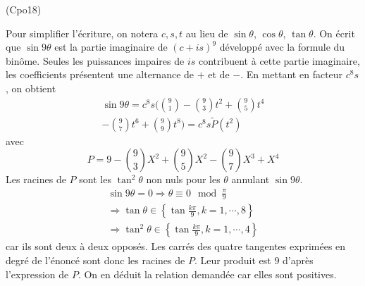\begin{tiny}(Cpo18)\end{tiny} Pour simplifier l'écriture, on notera $c, s, t$ au lieu de $\sin \theta$, $\cos \theta$, $\tan \theta$. On écrit que $\sin 9\theta$ est la partie imaginaire de $(c+is)^9$ développé avec la formule du binôme. Seules les puissances impaires de $is$ contribuent à cette partie imaginaire, les coefficients présentent une alternance de $+$ et de $-$. En mettant en facteur $c^8s$, on obtient
\begin{multline*}
 \sin 9\theta =c^8s ( 
\binom{9}{1}-\binom{9}{3}t^2 + \binom{9}{5}t^4\\
 -\binom{9}{7}t^6 + \binom{9}{9}t^8 ) 
= c^8s \widetilde{P}(t^2)
\end{multline*}
avec
\begin{displaymath}
 P= 9-\binom{9}{3}X^2 + \binom{9}{5}X^2 -\binom{9}{7}X^3 + X^4
\end{displaymath}
Les racines de $P$ sont les $\tan^2 \theta$ non nuls pour les $\theta$ annulant $\sin 9\theta$.
\begin{multline*}
 \sin 9\theta =0 \Rightarrow
\theta \equiv  0 \mod \frac{\pi}{9}\\
\Rightarrow \tan \theta \in\left\lbrace \tan \frac{k\pi}{9},k=1,\cdots,8\right\rbrace \\
\Rightarrow \tan^2 \theta \in\left\lbrace \tan \frac{k\pi}{9},k=1,\cdots,4\right\rbrace
\end{multline*}
car ils sont deux à deux opposés. Les carrés des quatre tangentes exprimées en degré de l'énoncé sont donc les racines de $P$. Leur produit est $9$ d'après l'expression de $P$. On en déduit la relation demandée car elles sont positives.
